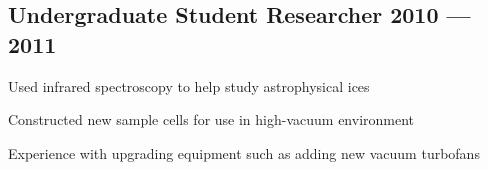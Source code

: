 \documentclass[letter,10pt]{article}
\begin{document}
\subsection{{Undergraduate Student Researcher \hfill 2010 --- 2011}}
\begin{zitemize}
\item Used infrared spectroscopy to help study astrophysical ices
\item Constructed new sample cells for use in high-vacuum environment
\item Experience with upgrading equipment such as adding new vacuum turbofans
\end{zitemize}

\end{document}
